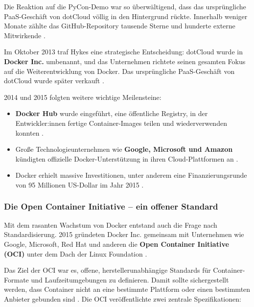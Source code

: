Die Reaktion auf die PyCon-Demo war so überwältigend, dass das 
ursprüngliche PaaS-Geschäft von dotCloud völlig in den Hintergrund 
rückte. Innerhalb weniger Monate zählte das GitHub-Repository 
tausende Sterne und hunderte externe Mitwirkende \cite{datacenter_docker}.

Im Oktober 2013 traf Hykes eine strategische Entscheidung: dotCloud 
wurde in \textbf{Docker Inc.} umbenannt, und das Unternehmen richtete 
seinen gesamten Fokus auf die Weiterentwicklung von Docker. Das 
ursprüngliche PaaS-Geschäft von dotCloud wurde später verkauft 
\cite{datacenter_docker}.

2014 und 2015 folgten weitere wichtige Meilensteine:

\begin{itemize}
    \item \textbf{Docker Hub} wurde eingeführt, eine öffentliche 
    Registry, in der Entwickler:innen fertige Container-Images teilen und 
    wiederverwenden konnten \cite{ionos_docker}.
    
    \item Große Technologieunternehmen wie \textbf{Google, Microsoft 
    und Amazon} kündigten offizielle Docker-Unterstützung in ihren 
    Cloud-Plattformen an \cite{ionos_docker}.
    
    \item Docker erhielt massive Investitionen, unter anderem eine 
    Finanzierungsrunde von 95 Millionen US-Dollar im Jahr 2015 
    \cite{datacenter_docker}.
\end{itemize}

\subsubsection{Die Open Container Initiative – ein offener Standard}

Mit dem rasanten Wachstum von Docker entstand auch die Frage nach 
Standardisierung. 2015 gründeten Docker Inc. gemeinsam mit Unternehmen 
wie Google, Microsoft, Red Hat und anderen die 
\textbf{Open Container Initiative (OCI)} unter dem Dach der Linux 
Foundation \cite{datacenter_docker}.

Das Ziel der OCI war es, offene, herstellerunabhängige Standards für 
Container-Formate und Laufzeitumgebungen zu definieren. Damit sollte 
sichergestellt werden, dass Container nicht an eine bestimmte Plattform 
oder einen bestimmten Anbieter gebunden sind \cite{ionos_docker}. 
Die OCI veröffentlichte zwei zentrale Spezifikationen:

